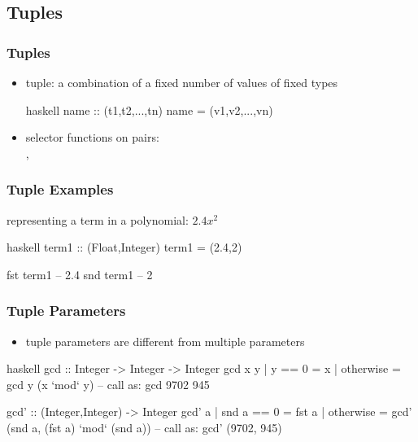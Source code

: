 \documentclass[dvipsnames]{beamer}
\theoremstyle{plain}
\begin{document}
\subsection{Tuples}

\begin{frame}[fragile]
  \frametitle{Tuples}

  \begin{itemize}
    \item \alert{tuple}: a combination of a fixed number of values
      of fixed types
    \begin{block}{}
      \begin{pygments}{haskell}
name :: (t1,t2,...,tn)
name = (v1,v2,...,vn)
      \end{pygments}
    \end{block}

    \medskip
    \item selector functions on pairs:\\
      , 
  \end{itemize}
\end{frame}

\begin{frame}[fragile]
  \frametitle{Tuple Examples}

  \begin{exampleblock}{representing a term in a polynomial: $2.4x^2$}
    \begin{pygments}{haskell}
term1 :: (Float,Integer)
term1 = (2.4,2)

fst term1  -- 2.4
snd term1  -- 2
    \end{pygments}
  \end{exampleblock}
\end{frame}

\begin{frame}[fragile]
  \frametitle{Tuple Parameters}

  \begin{itemize}
    \item tuple parameters are different from multiple parameters
  \end{itemize}

  \begin{exampleblock}{}
    \begin{pygments}{haskell}
gcd :: Integer -> Integer -> Integer
gcd x y
  | y == 0    = x
  | otherwise = gcd y (x `mod` y)
-- call as: gcd 9702 945

gcd' :: (Integer,Integer) -> Integer
gcd' a
  | snd a == 0 = fst a
  | otherwise  = gcd' (snd a, (fst a) `mod` (snd a))
-- call as: gcd' (9702, 945)
    \end{pygments}
  \end{exampleblock}
\end{frame}
\end{document}
